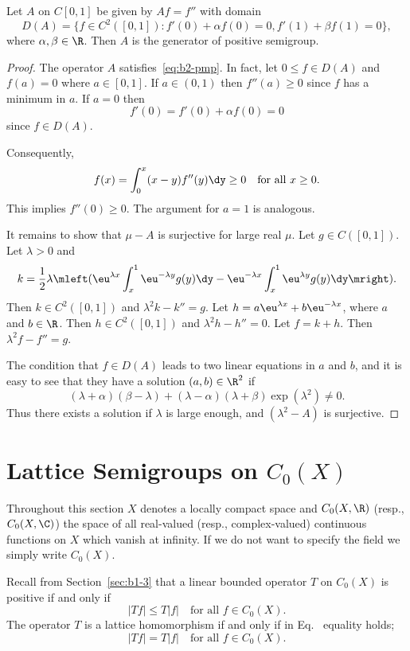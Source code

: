 \begin{example}\label{ex:b2-1.24}
Let $A$ on $C[0,1]$ be given by $Af = f''$ with domain 
\[
D(A) = \{f \in C^{2}([0,1]) \colon f'(0) + \alpha f(0) = 0, f'(1) + \beta f(1) = 0\},
\]
where $\alpha,\beta \in \R$.
Then $A$ is the generator of positive semigroup.
\end{example}
\begin{proof}
The operator $A$ satisfies~\eqref{eq:b2-pmp}.
In fact, let $0 \leq f \in D(A)$ and $f(a) = 0$ where $a \in [0,1]$.
If\/ $a \in (0,1)$ then $f''(a) \geq 0$ since $f$ has a minimum in $a$.
If\/ $a = 0$ then 
\[
f'(0) = f'(0) + \alpha f(0) = 0
\]
since $f \in D(A)$.

Consequently, 
%
\[
	f(x) = \int_{0}^{x} (x-y)f''(y) \dy \geq 0 
	\quad \text{for all $x \geq 0$.}
\]
%
This implies $f''(0) \geq 0$.
The argument for $a = 1$ is analogous.

It remains to show that $\mu - A$ is surjective for large real $\mu$.
Let $g \in C([0,1])$.
Let $\lambda > 0$ and 
\[k = \frac{1}{2}\lambda\mleft( \eu^{\lambda x}\int_{x}^{1} \eu^{-\lambda y}g(y)\dy - \eu^{-\lambda x}\int_{x}^{1} \eu^{\lambda y}g(y)\dy \mright).
\]
Then $k \in C^{2}([0,1])$ and $\lambda^{2}k - k'' = g$.
Let $h = a\eu^{\lambda x} + b\eu^{-\lambda x}$, where $a$ and $b \in \R$.
Then $h \in C^{2}([0,1])$ and $\lambda^{2}h - h'' = 0$.
Let $f = k + h$.
Then $\lambda^{2}f - f'' = g$.

The condition that $f \in D(A)$ leads to two linear equations in $a$ and $b$, and it is easy to see that they have a solution $(a,b) \in \R^{2}$ if\/ 
%
\[
	 (\lambda+\alpha)(\beta-\lambda) + (\lambda-\alpha)(\lambda+\beta)\exp(\lambda^{2}) \neq 0 .
\]
%
Thus there exists a solution if\/ $\lambda$ is large enough, and $(\lambda^{2} - A)$ is surjective.
\end{proof}
\section{Lattice Semigroups on  \texorpdfstring{$C_{0}(X)$}{C_{0}(X)}}\label{sec:b2-2}%
Throughout this section $X$ denotes a locally compact space and $C_{0}(X,\R)$ (resp., $C_{0}(X,\C)$) the space of all real-valued (resp., complex-valued) continuous functions on $X$ which vanish at infinity.
If we do not want to specify the field we simply write $C_{0}(X)$.

Recall from  Section~\ref{sec:b1-3} that a linear bounded operator $T$ on $C_{0}(X)$ is positive if and only if
\begin{equation}\label{eq:b2-2.1}
|Tf| \leq T|f| \quad \text{for all } f \in C_{0}(X).
\end{equation}
The operator $T$ is a lattice homomorphism if and only if in Eq.~ equality holds; \ie 
\begin{equation}\label{eq:b2-2.2}
|Tf| = T|f| \quad \text{for all } f \in C_{0}(X).
\end{equation}

